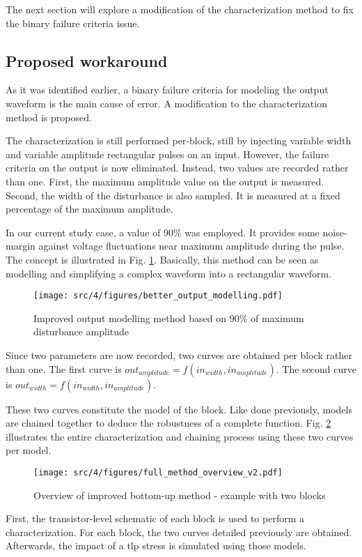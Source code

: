 
The next section will explore a modification of the characterization method to fix the binary failure criteria issue.

\subsection{Proposed workaround}
As it was identified earlier, a binary failure criteria for modeling the output waveform is the main cause of error.
A modification to the characterization method is proposed.

The characterization is still performed per-block, still by injecting variable width and variable amplitude rectangular pulses on an input.
However, the failure criteria on the output is now eliminated.
Instead, two values are recorded rather than one.
First, the maximum amplitude value on the output is measured.
Second, the width of the disturbance is also sampled.
It is measured at a fixed percentage of the maximum amplitude.

In our current study case, a value of 90\% was employed.
It provides some noise-margin against voltage fluctuations near maximum amplitude during the pulse.
The concept is illustrated in Fig. \ref{fig:impact-single-failure-criteria}.
Basically, this method can be seen as modelling and simplifying a complex waveform into a rectangular waveform.

\begin{figure}[!h]
  \centering
  \texttt{[image: src/4/figures/better\_output\_modelling.pdf]}
  \caption{Improved output modelling method based on 90\% of maximum disturbance amplitude}
  \label{fig:impact-single-failure-criteria}
\end{figure}

Since two parameters are now recorded, two curves are obtained per block rather than one.
The first curve is $out_{amplitude} = f(in_{width}, in_{amplitude})$.
The second curve is $out_{width} = f(in_{width}, in_{amplitude})$.

These two curves constitute the model of the block.
Like done previously, models are chained together to deduce the robustness of a complete function.
Fig. \ref{fig:full-method-v2} illustrates the entire characterization and chaining process using these two curves per model.

\begin{figure}[!hp]
  \centering
  \texttt{[image: src/4/figures/full\_method\_overview\_v2.pdf]}
  \caption{Overview of improved bottom-up method - example with two blocks}
  \label{fig:full-method-v2}
\end{figure}

First, the transistor-level schematic of each block is used to perform a characterization.
For each block, the two curves detailed previously are obtained.
Afterwards, the impact of a \gls{tlp} stress is simulated using those models.

